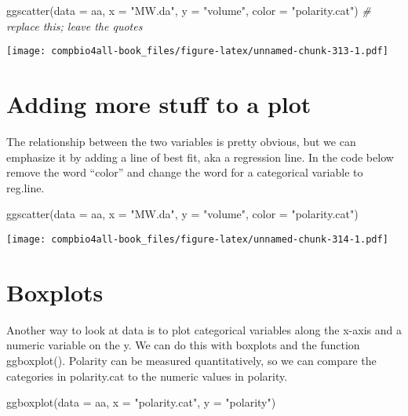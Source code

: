\documentclass[
]{book}
\newenvironment{Shaded}{\begin{snugshade}}{\end{snugshade}}
\newcommand{\AttributeTok}[1]{\textcolor[rgb]{0.77,0.63,0.00}{#1}}
\newcommand{\CommentTok}[1]{\textcolor[rgb]{0.56,0.35,0.01}{\textit{#1}}}
\newcommand{\FunctionTok}[1]{\textcolor[rgb]{0.00,0.00,0.00}{#1}}
\newcommand{\NormalTok}[1]{#1}
\newcommand{\StringTok}[1]{\textcolor[rgb]{0.31,0.60,0.02}{#1}}
\begin{document}
\begin{Shaded}
\begin{Highlighting}[]
\FunctionTok{ggscatter}\NormalTok{(}\AttributeTok{data =}\NormalTok{ aa, }
          \AttributeTok{x =} \StringTok{"MW.da"}\NormalTok{, }
          \AttributeTok{y =} \StringTok{"volume"}\NormalTok{,}
          \AttributeTok{color =} \StringTok{"polarity.cat"}\NormalTok{) }\CommentTok{\# replace this; leave the quotes}
\end{Highlighting}
\end{Shaded}

\texttt{[image: compbio4all-book\_files/figure-latex/unnamed-chunk-313-1.pdf]}

\hypertarget{adding-more-stuff-to-a-plot}{%
\section{Adding more stuff to a plot}\label{adding-more-stuff-to-a-plot}}

The relationship between the two variables is pretty obvious, but we can emphasize it by adding a line of best fit, aka a regression line. In the code below remove the word ``color'' and change the word for a categorical variable to reg.line.

\begin{Shaded}
\begin{Highlighting}[]
\FunctionTok{ggscatter}\NormalTok{(}\AttributeTok{data =}\NormalTok{ aa, }
          \AttributeTok{x =} \StringTok{"MW.da"}\NormalTok{, }
          \AttributeTok{y =} \StringTok{"volume"}\NormalTok{,}
          \AttributeTok{color =} \StringTok{"polarity.cat"}\NormalTok{) }
\end{Highlighting}
\end{Shaded}

\texttt{[image: compbio4all-book\_files/figure-latex/unnamed-chunk-314-1.pdf]}

\hypertarget{boxplots}{%
\section{Boxplots}\label{boxplots}}

Another way to look at data is to plot categorical variables along the x-axis and a numeric variable on the y. We can do this with boxplots and the function ggboxplot(). Polarity can be measured quantitatively, so we can compare the categories in polarity.cat to the numeric values in polarity.

\begin{Shaded}
\begin{Highlighting}[]
\FunctionTok{ggboxplot}\NormalTok{(}\AttributeTok{data =}\NormalTok{ aa,}
          \AttributeTok{x =} \StringTok{"polarity.cat"}\NormalTok{, }
          \AttributeTok{y =} \StringTok{"polarity"}\NormalTok{)}
\end{Highlighting}
\end{Shaded}
\end{document}
